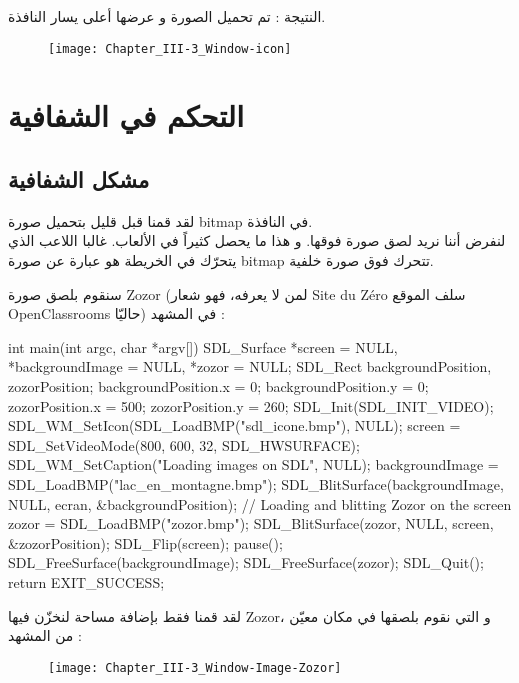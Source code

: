 النتيجة : تم تحميل الصورة و عرضها أعلى يسار النافذة.

\begin{figure}[H]
	\centering
	\texttt{[image: Chapter\_III-3\_Window-icon]}
\end{figure}

\section{التحكم في الشفافية}

\subsection{مشكل الشفافية}

لقد قمنا قبل قليل بتحميل صورة 
\textenglish{bitmap}
في النافذة.\\
لنفرض أننا نريد لصق صورة فوقها. و هذا ما يحصل كثيراً في الألعاب. غالبا اللاعب الذي يتحرّك في الخريطة هو عبارة عن صورة 
\textenglish{bitmap}
تتحرك فوق صورة خلفية.

سنقوم بلصق صورة
\textenglish{Zozor}
(لمن لا يعرفه، فهو شعار
\textenglish{Site du Zéro}
سلف الموقع 
\textenglish{OpenClassrooms}
حاليّا) في المشهد :

\begin{Csource}
int main(int argc, char *argv[])
{
	SDL_Surface *screen = NULL, *backgroundImage = NULL, *zozor = NULL;
	SDL_Rect backgroundPosition, zozorPosition;
	backgroundPosition.x = 0;
	backgroundPosition.y = 0;
	zozorPosition.x = 500;
	zozorPosition.y = 260;
	SDL_Init(SDL_INIT_VIDEO);
	SDL_WM_SetIcon(SDL_LoadBMP("sdl_icone.bmp"), NULL);
	screen = SDL_SetVideoMode(800, 600, 32, SDL_HWSURFACE);
	SDL_WM_SetCaption("Loading images on SDL", NULL);
	backgroundImage = SDL_LoadBMP("lac_en_montagne.bmp");
	SDL_BlitSurface(backgroundImage, NULL, ecran, &backgroundPosition);
	// Loading and blitting Zozor on the screen
	zozor = SDL_LoadBMP("zozor.bmp");
	SDL_BlitSurface(zozor, NULL, screen, &zozorPosition);
	SDL_Flip(screen);
	pause();
	SDL_FreeSurface(backgroundImage);
	SDL_FreeSurface(zozor);
	SDL_Quit();
	return EXIT_SUCCESS;
}
\end{Csource}

لقد قمنا فقط بإضافة مساحة لنخزّن فيها 
\textenglish{Zozor}،
و التي نقوم بلصقها في مكان معيّن من المشهد :

\begin{figure}[H]
	\centering
	\texttt{[image: Chapter\_III-3\_Window-Image-Zozor]}
\end{figure}


